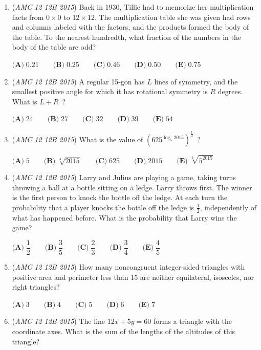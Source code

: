 \begin{enumerate}
	\item (\textit{AMC 12 12B 2015}) Back in 1930, Tillie had to memorize her multiplication facts from $0 \times 0$ to $12 \times 12$. The multiplication table she was given had rows and columns labeled with the factors, and the products formed the body of the table. To the nearest hundredth, what fraction of the numbers in the body of the table are odd?


 $\textbf{(A)}\; 0.21 \qquad\textbf{(B)}\; 0.25 \qquad\textbf{(C)}\; 0.46 \qquad\textbf{(D)}\; 0.50 \qquad\textbf{(E)}\; 0.75$


	\item (\textit{AMC 12 12B 2015}) A regular 15-gon has $L$ lines of symmetry, and the smallest positive angle for which it has rotational symmetry is $R$ degrees. What is $L+R$ ?


 $\textbf{(A)}\; 24 \qquad\textbf{(B)}\; 27 \qquad\textbf{(C)}\; 32 \qquad\textbf{(D)}\; 39 \qquad\textbf{(E)}\; 54$


	\item (\textit{AMC 12 12B 2015}) What is the value of $(625^{\log_5 2015})^{\frac{1}{4}}$ ?


 $\textbf{(A)}\; 5 \qquad\textbf{(B)}\; \sqrt[4]{2015} \qquad\textbf{(C)}\; 625 \qquad\textbf{(D)}\; 2015 \qquad\textbf{(E)}\; \sqrt[4]{5^{2015}}$


	\item (\textit{AMC 12 12B 2015}) Larry and Julius are playing a game, taking turns throwing a ball at a bottle sitting on a ledge. Larry throws first. The winner is the first person to knock the bottle off the ledge. At each turn the probability that a player knocks the bottle off the ledge is $\frac{1}{2}$, independently of what has happened before. What is the probability that Larry wins the game?


 $\textbf{(A)}\; \dfrac{1}{2} \qquad\textbf{(B)}\; \dfrac{3}{5} \qquad\textbf{(C)}\; \dfrac{2}{3} \qquad\textbf{(D)}\; \dfrac{3}{4} \qquad\textbf{(E)}\; \dfrac{4}{5}$


	\item (\textit{AMC 12 12B 2015}) How many noncongruent integer-sided triangles with positive area and perimeter less than 15 are neither equilateral, isosceles, nor right triangles?


 $\textbf{(A)}\; 3 \qquad\textbf{(B)}\; 4 \qquad\textbf{(C)}\; 5 \qquad\textbf{(D)}\; 6 \qquad\textbf{(E)}\; 7$


	\item (\textit{AMC 12 12B 2015}) The line $12x+5y=60$ forms a triangle with the coordinate axes. What is the sum of the lengths of the altitudes of this triangle?



\end{enumerate}
